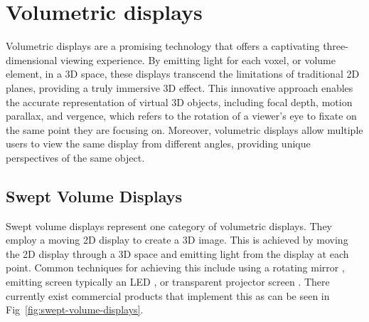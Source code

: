 \section{Volumetric displays}

Volumetric displays \cite{1492264} are a promising technology that offers a captivating three-dimensional viewing experience. By emitting light for each voxel, or volume element, in a 3D space, these displays transcend the limitations of traditional 2D planes, providing a truly immersive 3D effect. This innovative approach enables the accurate representation of virtual 3D objects, including focal depth, motion parallax, and vergence, which refers to the rotation of a viewer's eye to fixate on the same point they are focusing on. Moreover, volumetric displays allow multiple users to view the same display from different angles, providing unique perspectives of the same object.

\subsection{Swept Volume Displays}
Swept volume displays represent one category of volumetric displays. They employ a moving 2D display to create a 3D image. This is achieved by moving the 2D display through a 3D space and emitting light from the display at each point. Common techniques for achieving this include using a rotating mirror \cite{10.1117/12.480930}, emitting screen typically an LED \cite{Gately:11}, or transparent projector screen \cite{keane_volumetric_2016}. There currently exist commercial products that implement this as can be seen in Fig~\ref{fig:swept-volume-displays}.

